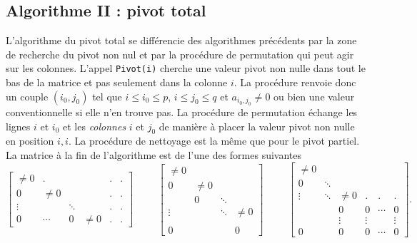 \subsection{Algorithme II : pivot total}
L'algorithme du pivot total se différencie des algorithmes précédents par la zone de recherche du pivot non nul et par la procédure de permutation qui peut agir sur les colonnes.\newline
L'appel \verb|Pivot(i)| cherche une valeur pivot non nulle dans tout le bas de la matrice et pas seulement dans la colonne $i$. La procédure renvoie donc un couple $(i_0,j_0)$ tel que $i\leq i_0\leq p$, $i\leq j_0 \leq q$ et $a_{i_0,j_0}\neq 0$ ou bien une valeur conventionnelle si elle n'en trouve pas.\newline
La procédure de permutation échange les lignes $i$ et $i_0$ et les \emph{colonnes} $i$ et $j_0$ de manière à placer la valeur pivot non nulle en position $i,i$.\newline
La procédure de nettoyage est la même que pour le pivot partiel.\newline
La matrice à la fin de l'algorithme est de l'une des formes suivantes  
\[
 \begin{bmatrix}
\neq 0 &   .     &        &        & . & . \\
0      & \neq 0  &        &        & . & . \\
\vdots &         & \ddots &        & . & . \\
0      &\cdots  &     0   &\neq 0  & . & .
 \end{bmatrix}
\hspace{1cm} 
 \begin{bmatrix}
\neq 0&       &       &  \\
 0    &\neq 0 &       &  \\
      & 0     &\ddots &  \\
\vdots&       &\ddots & \neq 0 \\
      &       &       &  \\
 0    &       &       & 0
 \end{bmatrix}
\hspace{1cm}
\begin{bmatrix}
 \neq 0 &  &  &  &  &  \\
 0 & \ddots &  &  &  &  \\
 \vdots &\ddots  &\neq 0 & .& .& . \\
        &        &0      &0 & \cdots &  0\\
        &        &\vdots & \vdots &  &\vdots  \\
 0      &        &   0   &   0    & \cdots & 0
\end{bmatrix}.
\]

